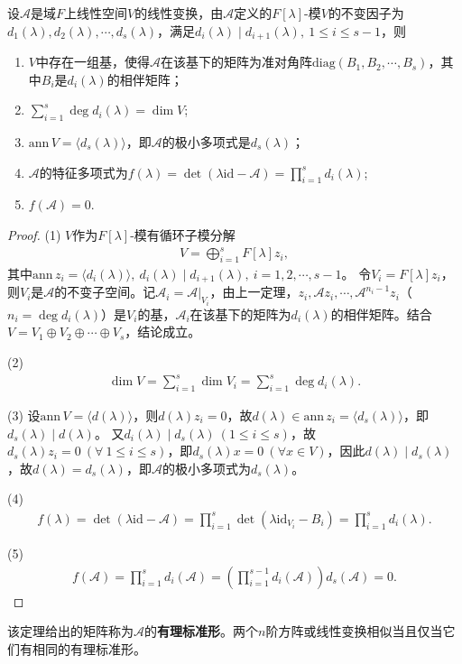 \documentclass[../../main.tex]{subfiles}%
\begin{document}
\begin{theorem}
设$\mathscr{A}$是域$F$上线性空间$V$的线性变换，由$\mathscr{A}$定义的$F[\lambda]$-模$V$的不变因子为$d_1(\lambda),d_2(\lambda),\cdots,d_s(\lambda)$，满足$d_i(\lambda)\mid d_{i+1}(\lambda),\ 1\leqslant i\leqslant s-1$，则
\begin{enumerate}[(1)]
\item $V$中存在一组基，使得$\mathscr{A}$在该基下的矩阵为准对角阵$\mathrm{diag}(B_1,B_2,\cdots,B_s)$，其中$B_i$是$d_i(\lambda)$的相伴矩阵；
\item $\displaystyle\sum_{i=1}^s\deg d_i(\lambda)=\dim V$;
\item $\mathrm{ann}\,V=\langle d_s(\lambda)\rangle$，即$\mathscr{A}$的极小多项式是$d_s(\lambda)$；
\item $\mathscr{A}$的特征多项式为$f(\lambda)=\det(\lambda\mathrm{id}-\mathscr{A})=\displaystyle\prod_{i=1}^s d_i(\lambda)$;
\item $f(\mathscr{A})=0$.
\end{enumerate}
\end{theorem}
\begin{proof}

(1) $V$作为$F[\lambda]$-模有循环子模分解
\begin{align*}
V=\bigoplus_{i=1}^s F[\lambda]z_i,
\end{align*}
其中$\mathrm{ann}\,z_i=\langle d_i(\lambda)\rangle,\ d_i(\lambda)\mid d_{i+1}(\lambda),\ i=1,2,\cdots,s-1$。
令$V_i=F[\lambda]z_i$，则$V_i$是$\mathscr{A}$的不变子空间。记$\mathscr{A}_i=\mathscr{A}|_{V_i}$，由上一定理，$z_i,\mathscr{A}z_i,\cdots,\mathscr{A}^{n_i-1}z_i$（$n_i=\deg d_i(\lambda)$）是$V_i$的基，$\mathscr{A}_i$在该基下的矩阵为$d_i(\lambda)$的相伴矩阵。结合$V=V_1\oplus V_2\oplus\cdots\oplus V_s$，结论成立。

(2) 
\begin{align*}
\dim V=\sum_{i=1}^s\dim V_i=\sum_{i=1}^s\deg d_i(\lambda).
\end{align*}

(3) 设$\mathrm{ann}\,V=\langle d(\lambda)\rangle$，则$d(\lambda)z_i=0$，故$d(\lambda)\in\mathrm{ann}\,z_i=\langle d_s(\lambda)\rangle$，即$d_s(\lambda)\mid d(\lambda)$。
又$d_i(\lambda)\mid d_s(\lambda)\ (1\leqslant i\leqslant s)$，故$d_s(\lambda)z_i=0\ (\forall\ 1\leqslant i\leqslant s)$，即$d_s(\lambda)x=0\ (\forall x\in V)$，因此$d(\lambda)\mid d_s(\lambda)$，故$d(\lambda)=d_s(\lambda)$，即$\mathscr{A}$的极小多项式为$d_s(\lambda)$。

(4)
\begin{align*}
f(\lambda)=\det(\lambda\mathrm{id}-\mathscr{A})=\prod_{i=1}^s\det(\lambda\mathrm{id}_{V_i}-B_i)=\prod_{i=1}^s d_i(\lambda).
\end{align*}

(5)
\begin{align*}
f(\mathscr{A})=\prod_{i=1}^s d_i(\mathscr{A})=\left(\prod_{i=1}^{s-1}d_i(\mathscr{A})\right)d_s(\mathscr{A})=0.
\end{align*}

\end{proof}
\begin{remark}
该定理给出的矩阵称为$\mathscr{A}$的\textbf{有理标准形}。两个$n$阶方阵或线性变换相似当且仅当它们有相同的有理标准形。
\end{remark}
\end{document}
